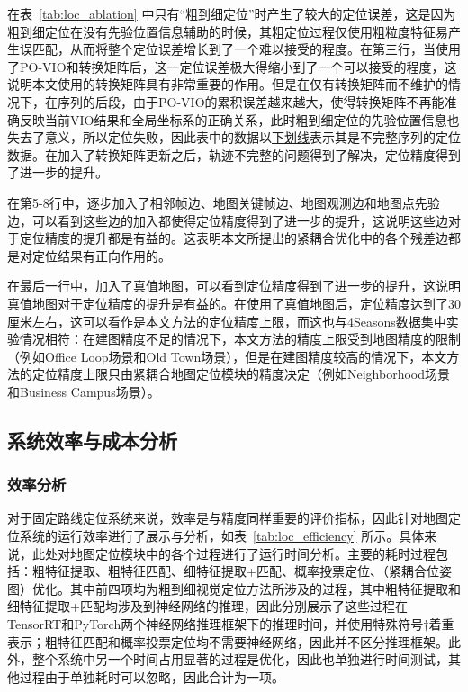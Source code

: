 在表~\ref{tab:loc_ablation} 中只有“粗到细定位”时产生了较大的定位误差，这是因为粗到细定位在没有先验位置信息辅助的时候，其粗定位过程仅使用粗粒度特征易产生误匹配，从而将整个定位误差增长到了一个难以接受的程度。在第三行，当使用了PO-VIO和转换矩阵后，这一定位误差极大得缩小到了一个可以接受的程度，这说明本文使用的转换矩阵具有非常重要的作用。但是在仅有转换矩阵而不维护的情况下，在序列的后段，由于PO-VIO的累积误差越来越大，使得转换矩阵不再能准确反映当前VIO结果和全局坐标系的正确关系，此时粗到细定位的先验位置信息也失去了意义，所以定位失败，因此表中的数据以\underline{下划线}表示其是不完整序列的定位数据。在加入了转换矩阵更新之后，轨迹不完整的问题得到了解决，定位精度得到了进一步的提升。

在第5-8行中，逐步加入了相邻帧边、地图关键帧边、地图观测边和地图点先验边，可以看到这些边的加入都使得定位精度得到了进一步的提升，这说明这些边对于定位精度的提升都是有益的。这表明本文所提出的紧耦合优化中的各个残差边都是对定位结果有正向作用的。

在最后一行中，加入了真值地图，可以看到定位精度得到了进一步的提升，这说明真值地图对于定位精度的提升是有益的。在使用了真值地图后，定位精度达到了30厘米左右，这可以看作是本文方法的定位精度上限，而这也与4Seasons数据集中实验情况相符：在建图精度不足的情况下，本文方法的精度上限受到地图精度的限制（例如Office Loop场景和Old Town场景），但是在建图精度较高的情况下，本文方法的定位精度上限只由紧耦合地图定位模块的精度决定（例如Neighborhood场景和Business Campus场景）。

\subsection{系统效率与成本分析}

\subsubsection{效率分析}

对于固定路线定位系统来说，效率是与精度同样重要的评价指标，因此针对地图定位系统的运行效率进行了展示与分析，如表~\ref{tab:loc_efficiency} 所示。具体来说，此处对地图定位模块中的各个过程进行了运行时间分析。主要的耗时过程包括：粗特征提取、粗特征匹配、细特征提取+匹配、概率投票定位、（紧耦合位姿图）优化。其中前四项均为粗到细视觉定位方法所涉及的过程，其中粗特征提取和细特征提取+匹配均涉及到神经网络的推理，因此分别展示了这些过程在TensorRT和PyTorch两个神经网络推理框架下的推理时间，并使用特殊符号${\dagger}$着重表示；粗特征匹配和概率投票定位均不需要神经网络，因此并不区分推理框架。此外，整个系统中另一个时间占用显著的过程是优化，因此也单独进行时间测试，其他过程由于单独耗时可以忽略，因此合计为一项。

